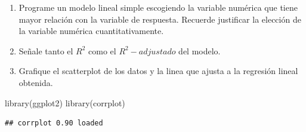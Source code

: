 \documentclass[]{article}
\newenvironment{Shaded}{\begin{snugshade}}{\end{snugshade}}
\newcommand{\AttributeTok}[1]{\textcolor[rgb]{0.77,0.63,0.00}{#1}}
\newcommand{\ConstantTok}[1]{\textcolor[rgb]{0.00,0.00,0.00}{#1}}
\newcommand{\DecValTok}[1]{\textcolor[rgb]{0.00,0.00,0.81}{#1}}
\newcommand{\FunctionTok}[1]{\textcolor[rgb]{0.00,0.00,0.00}{#1}}
\newcommand{\NormalTok}[1]{#1}
\newcommand{\OtherTok}[1]{\textcolor[rgb]{0.56,0.35,0.01}{#1}}
\newcommand{\SpecialCharTok}[1]{\textcolor[rgb]{0.00,0.00,0.00}{#1}}
\newcommand{\StringTok}[1]{\textcolor[rgb]{0.31,0.60,0.02}{#1}}
\providecommand{\tightlist}{%
  \setlength{\itemsep}{0pt}\setlength{\parskip}{0pt}}
\begin{document}
\begin{enumerate}
\def\labelenumi{\alph{enumi})}
\tightlist
\item
  Programe un modelo lineal simple escogiendo la variable numérica que
  tiene mayor relación con la variable de respuesta. Recuerde justificar
  la elección de la variable numérica cuantitativamente.
\item
  Señale tanto el \(R^2\) como el \(R^2-adjustado\) del modelo.
\item
  Grafique el scatterplot de los datos y la linea que ajusta a la
  regresión lineal obtenida.
\end{enumerate}

\begin{Shaded}
\begin{Highlighting}[]
\FunctionTok{library}\NormalTok{(ggplot2)}
\FunctionTok{library}\NormalTok{(corrplot)}
\end{Highlighting}
\end{Shaded}

\begin{verbatim}
## corrplot 0.90 loaded
\end{verbatim}

\begin{Shaded}
\end{Shaded}
\end{document}
